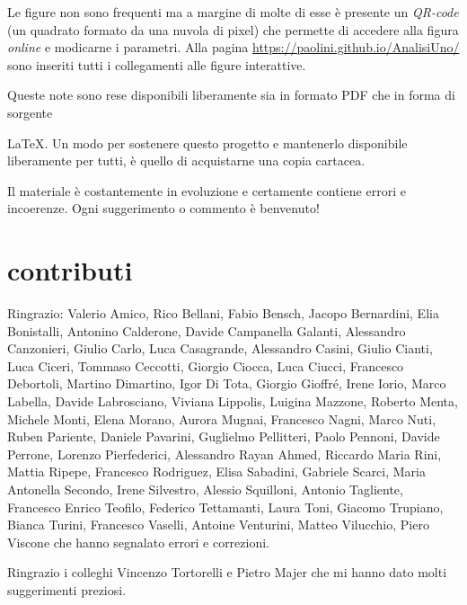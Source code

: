 Le figure non sono frequenti ma a margine di molte di esse  %
è presente un \emph{QR-code} (un quadrato formato da una nuvola di pixel) %
che permette di accedere alla figura  %
\emph{online} e modicarne i parametri.  %
Alla pagina \url{https://paolini.github.io/AnalisiUno/} 
sono inseriti tutti i collegamenti alle figure interattive.
\begin{comment}
Di seguito in questa pagina trovate l'elenco %
con i collegamenti alle figure interattive. %
\end{comment}
Queste note sono rese disponibili liberamente sia in formato PDF che %
in forma di sorgente %
\begin{comment}
LaTeX. %
\end{comment}
\LaTeX{}.
Un modo per sostenere questo progetto e mantenerlo disponibile liberamente 
per tutti, è quello di acquistarne una copia cartacea.

Il materiale è costantemente in evoluzione %
e certamente contiene errori e incoerenze. Ogni suggerimento o commento è %
benvenuto! %


\section*{contributi}

Ringrazio:
%
Valerio Amico,
Rico Bellani,
Fabio Bensch,
Jacopo Bernardini,
Elia Bonistalli,
Antonino Calderone,
Davide Campanella Galanti,
Alessandro Canzonieri,
Giulio Carlo,
Luca Casagrande,
Alessandro Casini,
Giulio Cianti,
Luca Ciceri,
Tommaso Ceccotti,
Giorgio Ciocca,
Luca Ciucci,
Francesco Debortoli,
Martino Dimartino,
Igor Di Tota,
Giorgio Gioffré,
Irene Iorio,
Marco Labella,
Davide Labrosciano,
Viviana Lippolis,
Luigina Mazzone,
Roberto Menta,
Michele Monti,
Elena Morano,
Aurora Mugnai,
Francesco Nagni,
Marco Nuti,
Ruben Pariente,
Daniele Pavarini,
Guglielmo Pellitteri,
Paolo Pennoni,
Davide Perrone,
Lorenzo Pierfederici,
Alessandro Rayan Ahmed,
Riccardo Maria Rini,
Mattia Ripepe,
Francesco Rodriguez,
Elisa Sabadini,
Gabriele Scarci,
Maria Antonella Secondo,
Irene Silvestro,
Alessio Squilloni,
Antonio Tagliente,
Francesco Enrico Teofilo,
Federico Tettamanti,
Laura Toni,
Giacomo Trupiano,
Bianca Turini,
Francesco Vaselli,
Antoine Venturini,
Matteo Vilucchio,
Piero Viscone
%
che hanno segnalato errori e correzioni.

Ringrazio i colleghi Vincenzo Tortorelli e Pietro Majer
che mi hanno dato molti suggerimenti preziosi.

